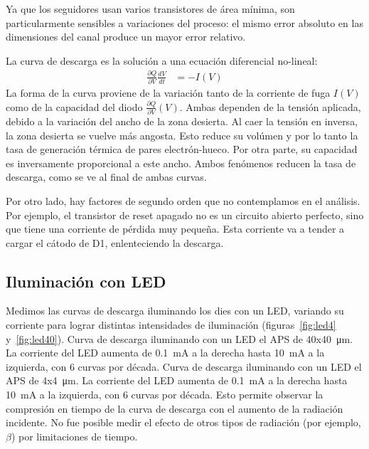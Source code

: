 Ya que los seguidores usan varios transistores de área mínima,
son particularmente sensibles a variaciones del proceso:
el mismo error absoluto en las dimensiones del canal produce un mayor error relativo.


La curva de descarga es la solución a una ecuación diferencial
no-lineal:
\begin{align*}
    \frac{\partial Q}{\partial V}\frac{dV}{dt} &= -I(V)
\end{align*}
La forma de la curva proviene de la variación 
tanto de la corriente de fuga $I(V)$ 
como de la capacidad del diodo $\frac{\partial Q}{\partial V}(V)$.
Ambas dependen de la tensión aplicada,
debido a la variación del ancho de la zona desierta.
Al caer la tensión en inversa,
la zona desierta se vuelve más angosta.
Esto reduce su volúmen y por lo tanto 
la tasa de generación térmica de pares electrón-hueco.
Por otra parte,
su capacidad es inversamente proporcional a este ancho.
Ambos fenómenos reducen la tasa de descarga,
como se ve al final de ambas curvas.

Por otro lado, hay factores de segundo orden 
que no contemplamos en el análisis.
Por ejemplo, el transistor de reset apagado
no es un circuito abierto perfecto, 
sino que tiene una corriente de pérdida muy pequeña.
Esta corriente va a tender a cargar el cátodo de D1,
enlenteciendo la descarga.
%
\subsection{Iluminación con LED}
Medimos las curvas de descarga iluminando los dies con un LED,
variando su corriente para lograr distintas intensidades de iluminación
(figuras~\ref{fig:led4} y~\ref{fig:led40}).
{Curva de descarga iluminando con un LED el APS de 40x\SI{40}{\micro\meter}.
La corriente del LED aumenta de \SI{.1}{\milli\ampere} a la derecha hasta
\SI{10}{\milli\ampere} a la izquierda,
con 6 curvas por década.}
{Curva de descarga iluminando con un LED el APS de 4x\SI{4}{\micro\meter}.
La corriente del LED aumenta de \SI{.1}{\milli\ampere} a la derecha hasta
\SI{10}{\milli\ampere} a la izquierda,
con 6 curvas por década.}
Esto permite observar la compresión en tiempo de la curva de descarga 
con el aumento de la radiación incidente.
No fue posible medir el efecto de otros tipos de radiación
(por ejemplo, $\beta$) por limitaciones de tiempo.
